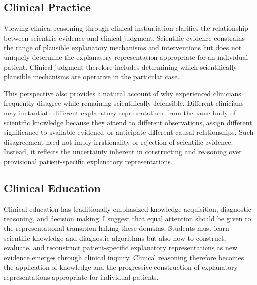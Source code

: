 \documentclass[11pt]{article}
\begin{document}
\subsection{Clinical Practice}

Viewing clinical reasoning through clinical instantiation clarifies the relationship between scientific evidence and clinical judgment. Scientific evidence constrains the range of plausible explanatory mechanisms and interventions but does not uniquely determine the explanatory representation appropriate for an individual patient. Clinical judgment therefore includes determining which scientifically plausible mechanisms are operative in the particular case.

This perspective also provides a natural account of why experienced clinicians frequently disagree while remaining scientifically defensible. Different clinicians may instantiate different explanatory representations from the same body of scientific knowledge because they attend to different observations, assign different significance to available evidence, or anticipate different causal relationships. Such disagreement need not imply irrationality or rejection of scientific evidence. Instead, it reflects the uncertainty inherent in constructing and reasoning over provisional patient-specific explanatory representations.

\subsection{Clinical Education}

Clinical education has traditionally emphasized knowledge acquisition, diagnostic reasoning, and decision making. I suggest that equal attention should be given to the representational transition linking these domains. Students must learn scientific knowledge and diagnostic algorithms but also how to construct, evaluate, and reconstruct patient-specific explanatory representations as new evidence emerges through clinical inquiry. Clinical reasoning therefore becomes the application of knowledge and the progressive construction of explanatory representations appropriate for individual patients.
\end{document}

